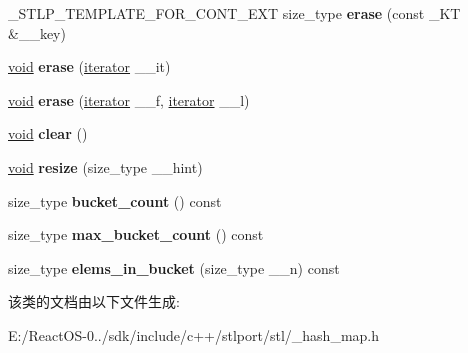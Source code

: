 \begin{DoxyCompactItemize}
\item 
\mbox{\label{classhash__map_a2caa82efd0b3ac008bdc97c5654a0d36}} 
\+\_\+\+S\+T\+L\+P\+\_\+\+T\+E\+M\+P\+L\+A\+T\+E\+\_\+\+F\+O\+R\+\_\+\+C\+O\+N\+T\+\_\+\+E\+XT size\+\_\+type {\bfseries erase} (const \+\_\+\+KT \&\+\_\+\+\_\+key)
\item 
\mbox{\label{classhash__map_a7be47d7e37f6da83948bab57f4a0c7b9}} 
\hyperlink{interfacevoid}{void} {\bfseries erase} (\hyperlink{structiterator}{iterator} \+\_\+\+\_\+it)
\item 
\mbox{\label{classhash__map_a5024136c36cccafc056d01d4125a73e4}} 
\hyperlink{interfacevoid}{void} {\bfseries erase} (\hyperlink{structiterator}{iterator} \+\_\+\+\_\+f, \hyperlink{structiterator}{iterator} \+\_\+\+\_\+l)
\item 
\mbox{\label{classhash__map_a63665ff5b047adbea99fd7906385fb1f}} 
\hyperlink{interfacevoid}{void} {\bfseries clear} ()
\item 
\mbox{\label{classhash__map_a92eaf9f426cf2ee7c44d955a115ca940}} 
\hyperlink{interfacevoid}{void} {\bfseries resize} (size\+\_\+type \+\_\+\+\_\+hint)
\item 
\mbox{\label{classhash__map_a38a335df1f3055b00d3b8b9c9bcd72b5}} 
size\+\_\+type {\bfseries bucket\+\_\+count} () const
\item 
\mbox{\label{classhash__map_a4a8932fc4c04545a5735f0d83f77a72c}} 
size\+\_\+type {\bfseries max\+\_\+bucket\+\_\+count} () const
\item 
\mbox{\label{classhash__map_ad1a6fe6bab564c9b700d3c5e8be8f7d2}} 
size\+\_\+type {\bfseries elems\+\_\+in\+\_\+bucket} (size\+\_\+type \+\_\+\+\_\+n) const
\end{DoxyCompactItemize}


该类的文档由以下文件生成\+:\begin{DoxyCompactItemize}
\item 
E\+:/\+React\+O\+S-\/0../sdk/include/c++/stlport/stl/\+\_\+hash\+\_\+map.\+h\end{DoxyCompactItemize}
